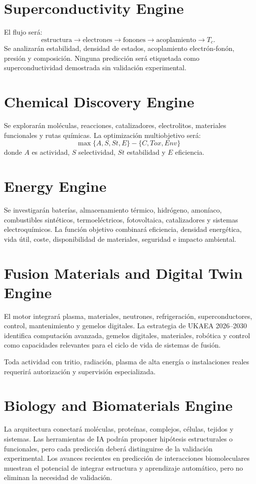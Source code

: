 \documentclass[11pt,a4paper]{article}
\begin{document}
\section{Superconductivity Engine}
El flujo será:
\[
\text{estructura}\rightarrow\text{electrones}\rightarrow\text{fonones}\rightarrow\text{acoplamiento}\rightarrow T_c.
\]
Se analizarán estabilidad, densidad de estados, acoplamiento electrón-fonón, presión y composición. Ninguna predicción será etiquetada como superconductividad demostrada sin validación experimental.

\section{Chemical Discovery Engine}
Se explorarán moléculas, reacciones, catalizadores, electrolitos, materiales funcionales y rutas químicas. La optimización multiobjetivo será:
\[
\max\{A,S,St,E\}-\{C,Tox,Env\}
\]
donde $A$ es actividad, $S$ selectividad, $St$ estabilidad y $E$ eficiencia.

\section{Energy Engine}
Se investigarán baterías, almacenamiento térmico, hidrógeno, amoníaco, combustibles sintéticos, termoeléctricos, fotovoltaica, catalizadores y sistemas electroquímicos. La función objetivo combinará eficiencia, densidad energética, vida útil, coste, disponibilidad de materiales, seguridad e impacto ambiental.

\section{Fusion Materials and Digital Twin Engine}
El motor integrará plasma, materiales, neutrones, refrigeración, superconductores, control, mantenimiento y gemelos digitales. La estrategia de UKAEA 2026--2030 identifica computación avanzada, gemelos digitales, materiales, robótica y control como capacidades relevantes para el ciclo de vida de sistemas de fusión. \cite{ukaea}

Toda actividad con tritio, radiación, plasma de alta energía o instalaciones reales requerirá autorización y supervisión especializada.

\section{Biology and Biomaterials Engine}
La arquitectura conectará moléculas, proteínas, complejos, células, tejidos y sistemas. Las herramientas de IA podrán proponer hipótesis estructurales o funcionales, pero cada predicción deberá distinguirse de la validación experimental. Los avances recientes en predicción de interacciones biomoleculares muestran el potencial de integrar estructura y aprendizaje automático, pero no eliminan la necesidad de validación. \cite{alphafold3}
\end{document}
